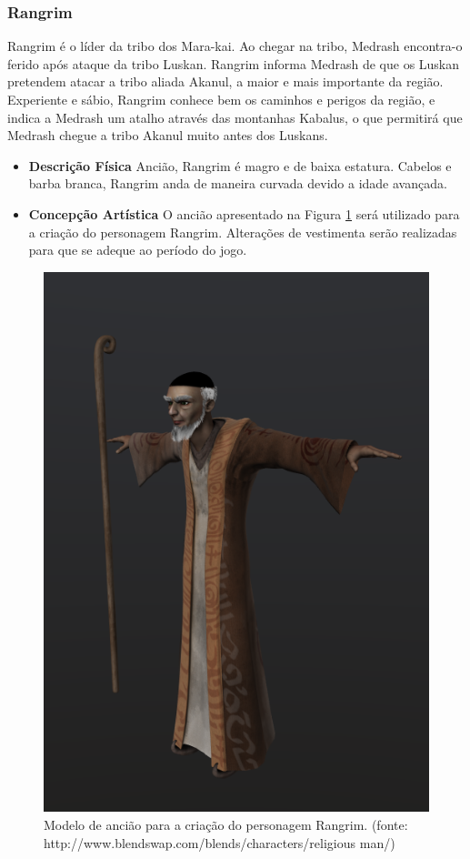 \subsubsection{Rangrim}
Rangrim é o líder da tribo dos Mara-kai. Ao chegar na tribo, Medrash
 encontra-o ferido após ataque da tribo Luskan. Rangrim informa Medrash de
 que os Luskan pretendem atacar a tribo aliada Akanul, a maior e mais
 importante da região. Experiente e sábio, Rangrim conhece bem os caminhos
 e perigos da região, e indica a Medrash um atalho através das montanhas
 Kabalus, o que permitirá que Medrash chegue a tribo Akanul muito antes dos
 Luskans.
\begin{itemize}
\item {\bf Descrição Física}
Ancião, Rangrim é magro e de baixa estatura. Cabelos e barba branca,
 Rangrim anda de maneira curvada devido a idade avançada.
\item {\bf Concepção Artística}
O ancião apresentado na Figura \ref{img:rangrim} será utilizado para a criação
 do personagem Rangrim. Alterações de vestimenta serão realizadas para que
 se adeque ao período do jogo.

\end{itemize}
\begin{figure}[ht]
 \centering
 \includegraphics[scale=0.5]{Imagens/rangrim01.png}
 \caption{Modelo de ancião para a criação do personagem Rangrim. (fonte: http://www.blendswap.com/blends/characters/religious man/)}
\label{img:rangrim}
\end{figure}

